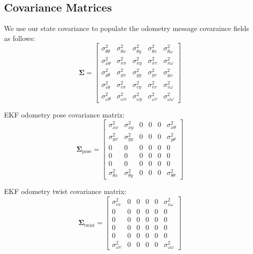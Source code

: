\documentclass[14pt,letterpaper]{article}
\begin{document}
\subsection{Covariance Matrices}

We use our state covariance to populate the odometry message covaraince fields as follows:
\begin{equation}
\boldsymbol{\Sigma} = \begin{bmatrix}
\sigma^2_{\theta\theta} & \sigma^2_{\theta x} & \sigma^2_{\theta y} & \sigma^2_{\theta v} & \sigma^2_{\theta\omega} \\[0.3em]
\sigma^2_{x\theta} & \sigma^2_{xx} & \sigma^2_{xy} & \sigma^2_{xv} & \sigma^2_{x\omega} \\[0.3em]
\sigma^2_{y\theta} & \sigma^2_{yx} & \sigma^2_{yy} & \sigma^2_{yv} & \sigma^2_{y\omega} \\[0.3em]
\sigma^2_{v\theta} & \sigma^2_{vx} & \sigma^2_{vy} & \sigma^2_{vv} & \sigma^2_{v\omega} \\[0.3em]
\sigma^2_{\omega\theta} & \sigma^2_{\omega x} & \sigma^2_{\omega y} & \sigma^2_{\omega v} & \sigma^2_{\omega\omega}
\end{bmatrix}
\end{equation}

EKF odometry pose covariance matrix:
\begin{equation}
\boldsymbol{\Sigma}_{\text{pose}} = \begin{bmatrix}
\sigma^2_{xx} & \sigma^2_{xy} & 0 & 0 & 0 & \sigma^2_{x\theta} \\[0.3em]
\sigma^2_{yx} & \sigma^2_{yy} & 0 & 0 & 0 & \sigma^2_{y\theta} \\[0.3em]
0 & 0 & 0 & 0 & 0 & 0 \\[0.3em]
0 & 0 & 0 & 0 & 0 & 0 \\[0.3em]
0 & 0 & 0 & 0 & 0 & 0 \\[0.3em]
\sigma^2_{\theta x} & \sigma^2_{\theta y} & 0 & 0 & 0 & \sigma^2_{\theta\theta}
\end{bmatrix}
\label{eq:pose_cov}
\end{equation}

EKF odometry twist covariance matrix:
\begin{equation}
\boldsymbol{\Sigma}_{\text{twist}} = \begin{bmatrix}
\sigma^2_{vv} & 0 & 0 & 0 & 0 & \sigma^2_{v\omega} \\[0.3em]
0 & 0 & 0 & 0 & 0 & 0 \\[0.3em]
0 & 0 & 0 & 0 & 0 & 0 \\[0.3em]
0 & 0 & 0 & 0 & 0 & 0 \\[0.3em]
0 & 0 & 0 & 0 & 0 & 0 \\[0.3em]
\sigma^2_{\omega v} & 0 & 0 & 0 & 0 & \sigma^2_{\omega\omega}
\end{bmatrix}
\label{eq:twist_cov}
\end{equation}
\end{document}

